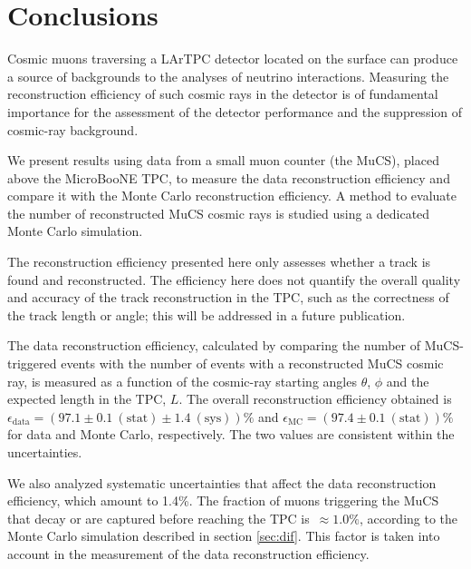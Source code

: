 \documentclass[a4paper,11pt]{article}
\begin{document}
\section{Conclusions}
Cosmic muons traversing a LArTPC detector located on the surface can produce a source of backgrounds to the analyses of neutrino interactions. Measuring the reconstruction efficiency of such cosmic rays in the detector is of fundamental importance for the assessment of the detector performance and the suppression of cosmic-ray background.

We present results using data from a small muon counter (the MuCS), placed above the MicroBooNE TPC, to measure the data reconstruction efficiency and compare it with the Monte Carlo reconstruction efficiency.
A method to evaluate the number of reconstructed MuCS cosmic rays is studied using a dedicated Monte Carlo simulation.

The reconstruction efficiency presented here only assesses whether a track is found and reconstructed. The efficiency here does not quantify the overall quality and accuracy of the track reconstruction in the TPC, such as the correctness of the track length or angle; this will be addressed in a future publication.

The data reconstruction efficiency, calculated by comparing the number of MuCS-triggered events with the number of events with a reconstructed MuCS cosmic ray, is measured as a function of the cosmic-ray starting angles $\theta$, $\phi$ and the expected length in the TPC, $L$. The overall reconstruction efficiency obtained is $\epsilon_{\mathrm{data}}=(97.1 \pm 0.1~\mathrm{(stat)} \pm 1.4~\mathrm{(sys)})\%$ and $\epsilon_{\mathrm{MC}} = (97.4 \pm 0.1~\mathrm{(stat)})\%$ for data and Monte Carlo, respectively. The two values are consistent within the uncertainties.



We also analyzed systematic uncertainties that affect the data reconstruction efficiency, which amount to 1.4\%. The fraction of muons triggering the MuCS that decay or are captured before reaching the TPC is~$\approx1.0\%$, according to the Monte Carlo simulation described in section \ref{sec:dif}. This factor is taken into account in the measurement of the data reconstruction efficiency.
\end{document}
